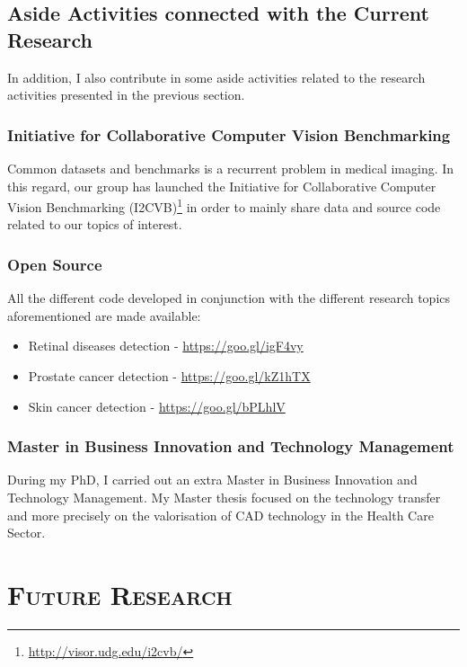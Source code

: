 \documentclass[a4paper]{article}
\begin{document}
\subsection{Aside Activities connected with the Current Research}

In addition, I also contribute in some aside activities related to the research activities presented in the previous section.

\subsubsection{Initiative for Collaborative Computer Vision Benchmarking}

Common datasets and benchmarks is a recurrent problem in medical imaging.
In this regard, our group has launched the Initiative for Collaborative Computer Vision Benchmarking (I2CVB)\footnote{\url{http://visor.udg.edu/i2cvb/}} in order to mainly share data and source code related to our topics of interest.

\subsubsection{Open Source}

All the different code developed in conjunction with the different research topics aforementioned are made available:

\begin{itemize}
\item Retinal diseases detection - \url{https://goo.gl/igF4vy}
\item Prostate cancer detection - \url{https://goo.gl/kZ1hTX}
\item Skin cancer detection - \url{https://goo.gl/bPLhlV}
\end{itemize}

\subsubsection{Master in Business Innovation and Technology Management}

During my PhD, I carried out an extra Master in Business Innovation and Technology Management.
My Master thesis focused on the technology transfer and more precisely on the valorisation of CAD technology in the Health Care Sector.

\section{\textsc{Future Research}} 
\end{document}
